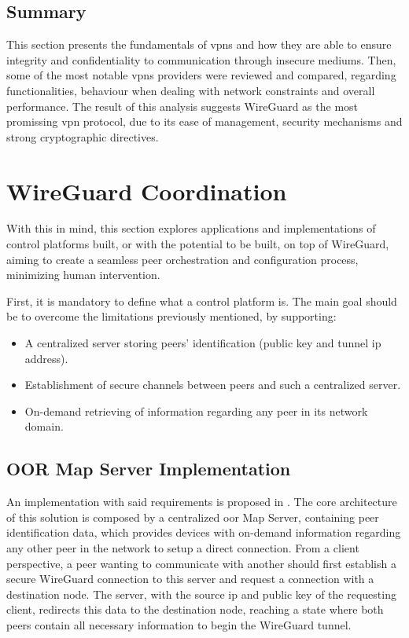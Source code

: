 \documentclass[11pt,twoside,a4paper]{report}
\begin{document}
\subsection{Summary}

This section presents the fundamentals of \acp{vpn} and how they are able to ensure integrity and confidentiality to communication through insecure mediums. Then, some of the most notable \acp{vpn} providers were reviewed and compared, regarding functionalities, behaviour when dealing with network constraints and overall performance. The result of this analysis suggests WireGuard as the most promissing \ac{vpn} protocol, due to its ease of management, security mechanisms and strong cryptographic directives.


\section{WireGuard Coordination}
\label{sec:coordination}

With this in mind, this section explores applications and implementations of control platforms built, or with the potential to be built, on top of WireGuard, aiming to create a seamless peer orchestration and configuration process, minimizing human intervention.

First, it is mandatory to define what a control platform is. The main goal should be to overcome the limitations previously mentioned, by supporting:

\begin{itemize}
     \item A centralized server storing peers' identification (public key and tunnel \ac{ip} address).
     \item Establishment of secure channels between peers and such a centralized server.
     \item On-demand retrieving of information regarding any peer in its network domain.
\end{itemize}

\subsection{OOR Map Server Implementation}

An implementation with said requirements is proposed in \cite{paillisse2021control}. The core architecture of this solution is composed by a centralized \ac{oor} Map Server, containing peer identification data, which provides devices with on-demand information regarding any other peer in the network to setup a direct connection.  From a client perspective, a peer wanting to communicate with another should first establish a secure WireGuard connection to this server and request a connection with a destination node. The server, with the source \ac{ip} and public key of the requesting client, redirects this data to the destination node, reaching a state where both peers contain all necessary information to begin the WireGuard tunnel.
\end{document}
